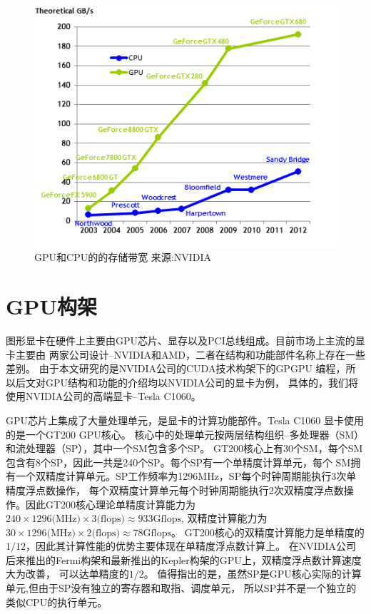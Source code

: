 \begin{figure}[htb]
  \centering
  \includegraphics[]{img/bandwidth}
  \caption{GPU和CPU的的存储带宽 \footnotesize 来源:NVIDIA}
  \label{fig:bandwidth}
\end{figure}

\section{GPU构架}\label{sec:gpu_arch}
图形显卡在硬件上主要由GPU芯片、显存以及PCI总线组成。目前市场上主流的显卡主要由
两家公司设计\---NVIDIA和AMD，二者在结构和功能部件名称上存在一些差别。
由于本文研究的是NVIDIA公司的CUDA技术构架下的GPGPU
编程，所以后文对GPU结构和功能的介绍均以NVIDIA公司的显卡为例，
具体的，我们将使用NVIDIA公司的高端显卡\---Tesla C1060。

GPU芯片上集成了大量处理单元，是显卡的计算功能部件。Tesla C1060 显卡使用的是一个GT200 GPU核心。
核心中的处理单元按两层结构组织\---多处理器（SM）和流处理器（SP），其中一个SM包含多个SP。
GT200核心上有30个SM，每个SM包含有8个SP，因此一共是240个SP。每个SP有一个单精度计算单元，每个
SM拥有一个双精度计算单元。SP工作频率为1296MHz，SP每个时钟周期能执行3次单精度浮点数操作，
每个双精度计算单元每个时钟周期能执行2次双精度浮点数操作。因此GT200核心理论单精度计算能力为
$240\times 1296\text{(MHz)}\times 3\text{(flops)} \approx 933\text{Gflops}$, 双精度计算能力为
$30\times 1296\text{(MHz)}\times 2\text{(flops)} \approx 78\text{Gflops}$。 
GT200核心的双精度计算能力是单精度的$1/12$，因此其计算性能的优势主要体现在单精度浮点数计算上。
在NVIDIA公司后来推出的Fermi构架和最新推出的Kepler构架的GPU上，双精度浮点数计算速度大为改善，
可以达单精度的$1/2$。
值得指出的是，虽然SP是GPU核心实际的计算单元,但由于SP没有独立的寄存器和取指、调度单元，
所以SP并不是一个独立的类似CPU的执行单元。

